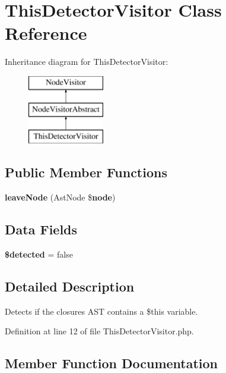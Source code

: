 \section{This\+Detector\+Visitor Class Reference}
\label{class_super_closure_1_1_analyzer_1_1_visitor_1_1_this_detector_visitor}
Inheritance diagram for This\+Detector\+Visitor\+:\begin{figure}[H]
\begin{center}
\leavevmode
\includegraphics[height=3.000000cm]{class_super_closure_1_1_analyzer_1_1_visitor_1_1_this_detector_visitor}
\end{center}
\end{figure}
\subsection*{Public Member Functions}
\begin{DoxyCompactItemize}
\item 
{\bf leave\+Node} (Ast\+Node \${\bf node})
\end{DoxyCompactItemize}
\subsection*{Data Fields}
\begin{DoxyCompactItemize}
\item 
{\bf \$detected} = false
\end{DoxyCompactItemize}


\subsection{Detailed Description}
Detects if the closure\textquotesingle{}s A\+S\+T contains a \$this variable. 

Definition at line 12 of file This\+Detector\+Visitor.\+php.



\subsection{Member Function Documentation}
